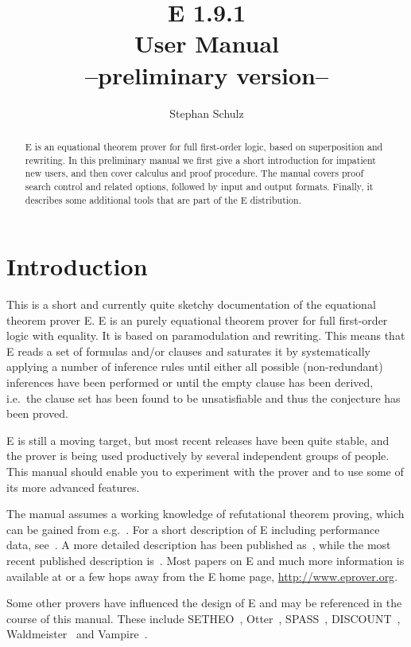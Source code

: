 \documentclass{report}
\author{Stephan Schulz}
\title{E 1.9.1\\[1.5ex]User Manual\\[1.5ex]{\normalsize --preliminary
    version--}}
\begin{document}
\maketitle{}

\begin{abstract}
  E is an equational theorem prover for full first-order logic, based
  on superposition and rewriting. In this preliminary manual we first
  give a short introduction for impatient new users, and then cover
  calculus and proof procedure. The manual covers proof search control
  and related options, followed by input and output formats. Finally,
  it describes some additional tools that are part of the E
  distribution.
\end{abstract}

\tableofcontents{}

\chapter{Introduction}
\label{sec:intro}

This is a short and currently quite sketchy documentation of the
equational theorem prover E. E is an purely equational theorem prover
for full first-order logic with equality. It is based on
paramodulation and rewriting. This means that E reads a set of
formulas and/or clauses and saturates it by systematically applying a
number of inference rules until either all possible (non-redundant)
inferences have been performed or until the empty clause has been
derived, i.e.\ the clause set has been found to be unsatisfiable and
thus the conjecture has been proved.

E is still a moving target, but most recent releases have been quite
stable, and the prover is being used productively by several
independent groups of people. This manual should enable you to
experiment with the prover and to use some of its more advanced
features.

The manual assumes a working knowledge of refutational theorem
proving, which can be gained from e.g.~\cite{CL73}. For a short
description of E including performance data,
see~\cite{Schulz:IJCAR-2004}. A more detailed description has been
published as~\cite{Schulz:AICOM-2002}, while the most recent published
description is~\cite{Schulz:LPAR-2013}. Most papers on E and much more
information is available at or a few hops away from the E home page,
\url{http://www.eprover.org}.

Some other provers have influenced the design of E and may be
referenced in the course of this manual. These include
SETHEO~\cite{MILSGSM:JAR-97},
Otter~\cite{Mc94,MW:JAR-97},
SPASS~\cite{WGR96,WABCEKTT:CADE-99},
DISCOUNT~\cite{DKS97}, Waldmeister~\cite{BHF96,HJL:CADE-99} and
Vampire~\cite{RV:AICOM-2002,RV:IJCAR-2001}.
\end{document}
